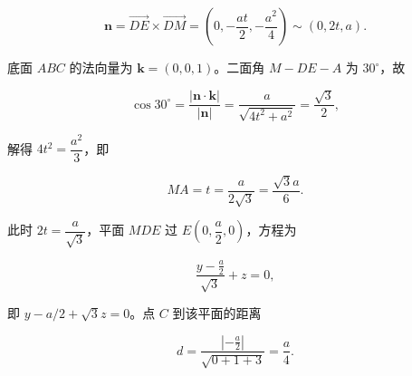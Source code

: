 \begin{answer}
\nopagebreak[4]
\[\boldsymbol n=\overrightarrow{DE}\times\overrightarrow{DM}=\left(0,-\frac{at}2,-\frac{a^2}4\right)\sim(0,2t,a).\]

底面 $ABC$ 的法向量为 $\boldsymbol k=(0,0,1)$。二面角 $M-DE-A$ 为 $30^\circ$，故

\nopagebreak[4]
\[\cos30^\circ=\frac{|\boldsymbol n\cdot\boldsymbol k|}{|\boldsymbol n|}=\frac{a}{\sqrt{4t^2+a^2}}=\frac{\sqrt3}2,\]

解得 $4t^2=\dfrac{a^2}3$，即

\nopagebreak[4]
\[MA=t=\frac{a}{2\sqrt3}=\frac{\sqrt3a}6.\]

此时 $2t=\dfrac{a}{\sqrt3}$，平面 $MDE$ 过 $E\left(0,\dfrac a2,0\right)$，方程为

\nopagebreak[4]
\[\frac{y-\frac a2}{\sqrt3}+z=0,\]

即 $y-a/2+\sqrt3z=0$。点 $C$ 到该平面的距离

\nopagebreak[4]
\[d=\frac{\left|-\frac a2\right|}{\sqrt{0+1+3}}=\frac a4.\]


\end{answer}
